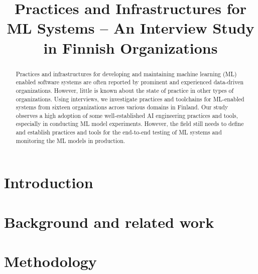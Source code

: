 \documentclass{IEEEcsmag}
\begin{document}
\title{Practices and Infrastructures for ML Systems -- An Interview Study in Finnish Organizations}

\author{
}

\begin{abstract}
Practices and infrastructures for developing and maintaining machine learning (ML) enabled software systems are often reported by prominent and experienced data-driven organizations. However, little is known about the state of practice in other types of organizations. Using interviews, we investigate practices and toolchains for ML-enabled systems from sixteen organizations across various domains in Finland. Our study observes a high adoption of some well-established AI engineering practices and tools, especially in conducting ML model experiments. However, the field still needs to define and establish practices and tools for the end-to-end testing of ML systems and monitoring the ML models in production.
\end{abstract}

\maketitle

\section{\textbf{Introduction}}
\label{sec: introduction}



\section{\textbf{Background and related work}}
\label{sec:background}



\section{\textbf{Methodology}}
\label{sec: methodology}



%
\end{document}
